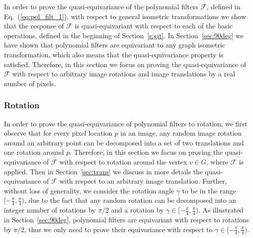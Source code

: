\documentclass[10pt,journal,compsoc]{IEEEtran}
\newcommand{\renata}[1]{\textcolor{black}{#1}}
\newcommand{\mF}{\mathcal{F}}
\begin{document}
	
	
In order to prove the quasi-equivariance of the polynomial filters $\mathcal{F}$, defined in  Eq.~(\ref{eq:pol_filt_1}), with respect to general isometric transformations we show that the response of $\mathcal{F}$ is quasi-equivariant with respect to each of the basic operations, defined in the beginning of Section~\ref{s:git}. In Section~\ref{sec:90deg} we have shown that polynomial filters are equivariant to any graph isometric transformation, which also means that the quasi-equivariance property is satisfied. Therefore, in this section we focus on proving the quasi-equivariance of $\mathcal{F}$ with respect to arbitrary image rotations and image translations by a real number of pixels.
	

	
	
	
	
	\subsubsection{Rotation}
	\label{sec:rot}
	
In order to prove the quasi-equivariance of polynomial filters to rotation, we first observe that for every pixel location $p$ in an image, any random image rotation around an arbitrary point can be decomposed into a set of two translations and one rotation around $p$. Therefore, in this section we focus on proving the quasi-equivariance of $\mF$ with respect to rotation around the vertex $v \in G$, where $\mF$ is applied. Then in Section~\ref{sec:trans} we discuss in more details the quasi-equivariance of $\mF$ with respect to an arbitrary image translation. Further, without loss of generality, we consider the rotation angle $\gamma$ to be in the range $[-\frac{\pi}{4},\frac{\pi}{4})$, due to the fact that any random rotation can be decomposed into an integer number of rotations by $\pi/2$ and a rotation by $\gamma \in [-\frac{\pi}{4},\frac{\pi}{4})$. As illustrated in Section~\ref{sec:90deg}, polynomial filters are equivariant with respect to rotations by $\pi/2$, thus we only need to prove their equivariance with respect to $\gamma \in [-\frac{\pi}{4},\frac{\pi}{4})$.
	
\end{document}
